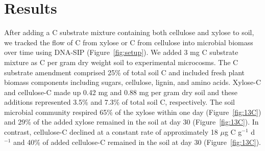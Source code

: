 \section{Results}
After adding a C substrate mixture containing both cellulose and xylose to
soil, we tracked the flow of C from xylose or C from cellulose into microbial
biomass over time using DNA-SIP (Figure~\ref{fig:setup}). We added 3 mg
C substrate mixture as C per gram dry weight soil to experimental microcosms.
The C substrate amendment comprised 25\% of total soil C and included fresh
plant biomass components including sugars, cellulose, lignin, and amino acids.
Xylose-C and cellulose-C made up 0.42 mg and 0.88 mg per gram dry soil
and these additions represented 3.5\% and 7.3\% of total soil C, respectively.
The soil microbial community respired 65\% of the xylose within one day
(Figure~\ref{fig:13C}) and 29\% of the added xylose remained in the soil at day
30 (Figure~\ref{fig:13C}). In contrast, cellulose-C declined at a constant rate
of approximately 18 $\mu$g C g$^{-1}$ d$^{-1}$ and 40\% of added cellulose-C
remained in the soil at day 30 (Figure~\ref{fig:13C}). 

